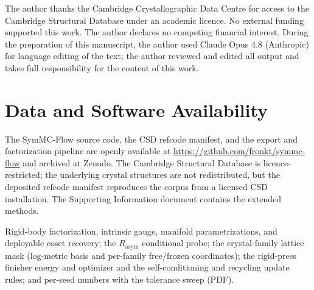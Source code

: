 \documentclass[journal=jcisd8,manuscript=article]{achemso}
\begin{document}
\begin{acknowledgement}
The author thanks the Cambridge Crystallographic Data Centre for access to the
Cambridge Structural Database under an academic licence. No external funding
supported this work. The author declares no competing financial interest. During
the preparation of this manuscript, the author used Claude Opus 4.8 (Anthropic)
for language editing of the text; the author reviewed and edited all output and
takes full responsibility for the content of this work.
\end{acknowledgement}

\section*{Data and Software Availability}
The SymMC-Flow source code, the CSD refcode manifest, and the export and
factorization pipeline are openly available at
\url{https://github.com/fronkt/symmc-flow} and archived at
Zenodo\cite{cai2026symmcflow}. The Cambridge Structural Database is
licence-restricted; the underlying crystal structures are not redistributed, but
the deposited refcode manifest reproduces the corpus from a licensed CSD
installation. The Supporting Information document contains the extended methods.

\begin{suppinfo}
Rigid-body factorization, intrinsic gauge, manifold parametrizations, and
deployable coset recovery; the $R_{\text{asym}}$ conditional probe; the
crystal-family lattice mask (log-metric basis and per-family free/frozen
coordinates); the rigid-press finisher energy and optimizer and the
self-conditioning and recycling update rules; and per-seed numbers with the
tolerance sweep (PDF).
\end{suppinfo}


\end{document}
